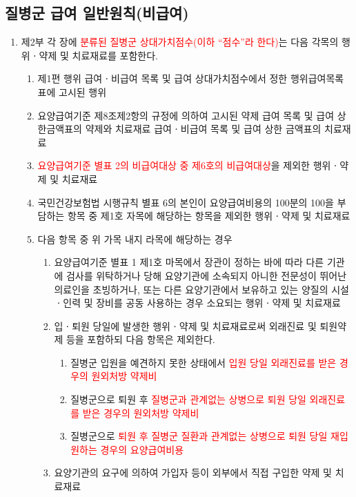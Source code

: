 \subsection{질병군 급여 일반원칙(비급여)}
\begin{myshadowbox}
\begin{enumerate}[4.]\tightlist
\item 제2부 각 장에 \textcolor{red}{분류된 질병군 상대가치점수(이하 “점수”라 한다)}는 다음 각목의 행위ㆍ약제 및 치료재료를 포함한다.
	\begin{enumerate}[가.]\tightlist
	\item 제1편 행위 급여ㆍ비급여 목록 및 급여 상대가치점수에서 정한 행위급여목록표에 고시된 행위
	\item 요양급여기준 제8조제2항의 규정에 의하여 고시된 약제 급여 목록 및 급여 상한금액표의 약제와 치료재료 급여ㆍ비급여 목록 및 급여 상한 금액표의 치료재료
	\item \textcolor{red}{요양급여기준 별표 2의 비급여대상 중 제6호의 비급여대상}을 제외한 행위ㆍ약제 및 치료재료
	\item 국민건강보험법 시행규칙 별표 6의 본인이 요양급여비용의 100분의 100을 부담하는 항목 중 제1호 자목에 해당하는 항목을 제외한 행위ㆍ약제 및 치료재료
	\item 다음 항목 중 위 가목 내지 라목에 해당하는 경우
		\begin{enumerate}[(1)]\tightlist
		\item 요양급여기준 별표 1 제1호 마목에서 장관이 정하는 바에 따라 다른 기관에 검사를 위탁하거나 당해 요양기관에 소속되지 아니한 전문성이 뛰어난 의료인을 초빙하거나, 또는 다른 요양기관에서 보유하고 있는 양질의 시설ㆍ인력 및 장비를 공동 사용하는 경우 소요되는 행위ㆍ약제 및 치료재료
		\item 입ㆍ퇴원 당일에 발생한 행위ㆍ약제 및 치료재료로써 외래진료 및 퇴원약제 등을 포함하되 다음 항목은 제외한다.
			\begin{enumerate}[(가)]\tightlist
			\item 질병군 입원을 예견하지 못한 상태에서 \textcolor{red}{입원 당일 외래진료를 받은 경우의 원외처방 약제비}
			\item 질병군으로 퇴원 후 \textcolor{red}{질병군과 관계없는 상병으로 퇴원 당일 외래진료를 받은 경우의 원외처방 약제비}
			\item 질병군으로 \textcolor{red}{퇴원 후 질병군 질환과 관계없는 상병으로 퇴원 당일 재입원하는 경우의 요양급여비용}
			\end{enumerate}
		\item 요양기관의 요구에 의하여 가입자 등이 외부에서 직접 구입한 약제 및 치료재료
		\end{enumerate}
	\end{enumerate}	
\end{enumerate}
\end{myshadowbox}
